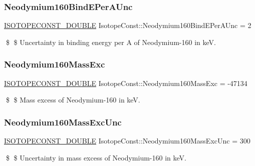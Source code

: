 \subsubsection{\texorpdfstring{Neodymium160\+Bind\+E\+Per\+A\+Unc}{Neodymium160BindEPerAUnc}}
{\footnotesize\ttfamily \mbox{\hyperlink{group___isotope_const-_macros_ga8f45a7272ce02c0b4c65c44636ed719a}{I\+S\+O\+T\+O\+P\+E\+C\+O\+N\+S\+T\+\_\+\+D\+O\+U\+B\+LE}} Isotope\+Const\+::\+Neodymium160\+Bind\+E\+Per\+A\+Unc = 2}

\$ \$ Uncertainty in binding energy per A of Neodymium-\/160 in keV. \mbox{\label{group___isotope_const-_neodymium-_nd160_ga83e020ee131bd3d1e671ee97cba31f00}} 
\subsubsection{\texorpdfstring{Neodymium160\+Mass\+Exc}{Neodymium160MassExc}}
{\footnotesize\ttfamily \mbox{\hyperlink{group___isotope_const-_macros_ga8f45a7272ce02c0b4c65c44636ed719a}{I\+S\+O\+T\+O\+P\+E\+C\+O\+N\+S\+T\+\_\+\+D\+O\+U\+B\+LE}} Isotope\+Const\+::\+Neodymium160\+Mass\+Exc = -\/47134}

\$ \$ Mass excess of Neodymium-\/160 in keV. \mbox{\label{group___isotope_const-_neodymium-_nd160_ga3506365e362f5f89a28a04f76435516e}} 
\subsubsection{\texorpdfstring{Neodymium160\+Mass\+Exc\+Unc}{Neodymium160MassExcUnc}}
{\footnotesize\ttfamily \mbox{\hyperlink{group___isotope_const-_macros_ga8f45a7272ce02c0b4c65c44636ed719a}{I\+S\+O\+T\+O\+P\+E\+C\+O\+N\+S\+T\+\_\+\+D\+O\+U\+B\+LE}} Isotope\+Const\+::\+Neodymium160\+Mass\+Exc\+Unc = 300}

\$ \$ Uncertainty in mass excess of Neodymium-\/160 in keV. \mbox{\label{group___isotope_const-_neodymium-_nd160_ga859d07954675a115b2733ed6a543b1ed}} 
